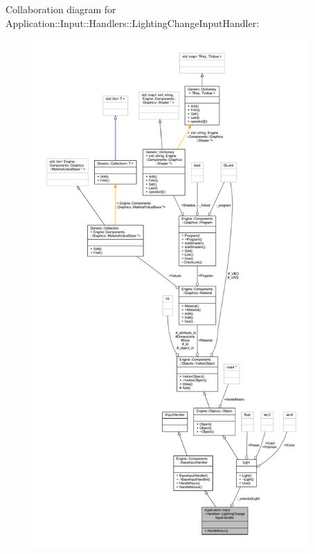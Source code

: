 Collaboration diagram for Application\+:\+:Input\+:\+:Handlers\+:\+:Lighting\+Change\+Input\+Handler\+:
\nopagebreak
\begin{figure}[H]
\begin{center}
\leavevmode
\includegraphics[height=550pt]{classApplication_1_1Input_1_1Handlers_1_1LightingChangeInputHandler__coll__graph}
\end{center}
\end{figure}
